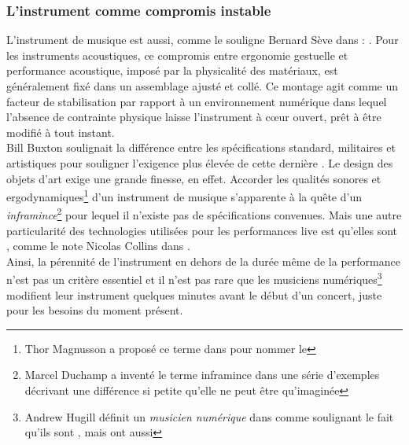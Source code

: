 	
\subsubsection{L'instrument comme compromis instable}

\noindent L'instrument de musique est aussi, comme le souligne Bernard Sève dans \cite{seve_instrument_2013} : . Pour les instruments acoustiques, ce compromis entre ergonomie gestuelle et performance acoustique, imposé par la physicalité des matériaux, est généralement fixé dans un assemblage ajusté et collé. Ce montage agit comme un facteur de stabilisation par rapport à un environnement numérique dans lequel l'absence de contrainte physique laisse l'instrument à cœur ouvert, prêt à être modifié à tout instant.\\
\indent Bill Buxton soulignait la différence entre les spécifications standard, militaires et artistiques pour souligner l'exigence plus élevée de cette dernière \cite{buxton_artists_1997}. Le design des objets d'art exige une grande finesse, en effet. Accorder les qualités sonores et ergodynamiques\footnote{Thor Magnusson a proposé ce terme dans \cite{magnusson_ergodynamics_2019} pour nommer le } d'un instrument de musique s'apparente à la quête d'un \textit{inframince}\footnote{Marcel Duchamp \cite{duchamp_notes_2008} a inventé le terme inframince dans une série d'exemples décrivant une différence si petite qu'elle ne peut être qu'imaginée} pour lequel il n'existe pas de spécifications convenues. Mais une autre particularité des technologies utilisées pour les performances live est qu'elles sont , comme le note Nicolas Collins dans \cite{collins_semiconducting_2013}.\\
\indent Ainsi, la pérennité de l'instrument en dehors de la durée même de la performance n'est pas un critère essentiel et il n'est pas rare que les musiciens numériques\footnote{Andrew Hugill définit un \textit{musicien numérique} dans \cite{hugill_digital_2019} comme  soulignant le fait qu'ils sont , mais ont aussi } modifient leur instrument quelques minutes avant le début d'un concert, juste pour les besoins du moment présent.

